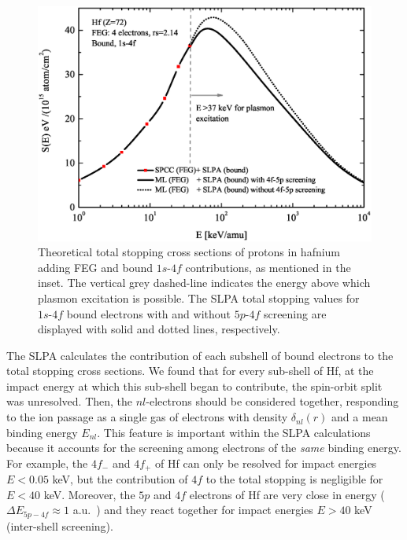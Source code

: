 \documentclass[aps,pra,reprint,groupedaddress,showpacs,showkeys]{revtex4-1} %
\begin{document}
\begin{figure}[!t]
\centering
\includegraphics[width=13.cm]{Fig02.eps}
\caption{Theoretical total stopping cross sections of protons in hafnium 
adding FEG and bound $1s$-$4f$ contributions, as mentioned in the inset. 
The vertical grey dashed-line indicates the energy above which plasmon 
excitation is possible. %
The SLPA total stopping values for $1s$-$4f$ 
bound electrons with and without $5p$-$4f$ screening are displayed with 
solid and dotted lines, respectively.}
\label{slpa4f}
\end{figure}

The SLPA calculates the contribution of each subshell of bound electrons 
to the total stopping cross sections. We found that for every sub-shell 
of Hf, at the impact energy at which this sub-shell began to contribute, 
the spin-orbit split was unresolved. Then, the $nl$-electrons should be 
considered together, responding to the ion passage as a single gas of 
electrons with density $\delta_{nl}(r)$ and a mean binding energy 
$E_{nl}$. This feature is important within the SLPA calculations because 
it accounts for the screening among electrons of the \textit{same} 
binding energy. For example, the $4f_{-}$ and $4f_{+}$ of Hf can only 
be resolved for impact energies $E<0.05$ keV, but the contribution of 
$4f$ to the total stopping is negligible for $E<40$ keV. Moreover, the 
$5p$ and $4f$ electrons of Hf are very close in energy 
($\Delta E_{5p-4f} \approx 1$ a.u.~\cite{mendez2019}) and they react 
together for impact energies $E>40$ keV (inter-shell screening).
\end{document}
